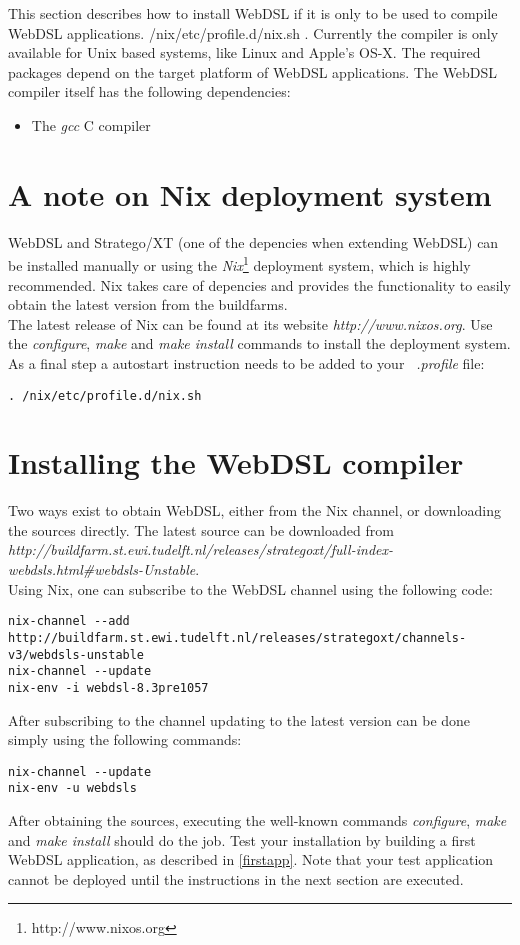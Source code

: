 This section describes how to install WebDSL if it is only to be used to compile WebDSL applications. /nix/etc/profile.d/nix.sh
. Currently the compiler is only available for Unix based systems, like Linux and Apple's OS-X. The required packages depend on the target platform of WebDSL applications. 
The WebDSL compiler itself has the following dependencies:
\begin{itemize}
	\item The \emph{gcc} C compiler
\end{itemize}

\section[installnix]{A note on Nix deployment system}
WebDSL and Stratego/XT (one of the depencies when extending WebDSL) can be installed manually or using the \emph{Nix}\footnote{http://www.nixos.org} deployment system, which is highly recommended. Nix takes care of depencies and provides the functionality to easily obtain the latest version from the buildfarms.
\\
The latest release of Nix can be found at its website \emph{http://www.nixos.org}. Use the \emph{configure}, \emph{make} and \emph{make install} commands to install the deployment system. As a final step a autostart instruction needs to be added to your \emph{~.profile} file:
\begin{lstlisting}
. /nix/etc/profile.d/nix.sh
\end{lstlisting}

\section[retreivewebdsl]{Installing the WebDSL compiler}
Two ways exist to obtain WebDSL, either from the Nix channel, or downloading the sources directly. The latest source can be downloaded from \emph{http://buildfarm.st.ewi.tudelft.nl/releases/strategoxt/full-index-webdsls.html\#webdsls-Unstable}.
\\
Using Nix, one can subscribe to the WebDSL channel using the following code: 
\begin{lstlisting}
nix-channel --add http://buildfarm.st.ewi.tudelft.nl/releases/strategoxt/channels-v3/webdsls-unstable
nix-channel --update
nix-env -i webdsl-8.3pre1057
\end{lstlisting}
After subscribing to the channel updating to the latest version can be done simply using the following commands:
\begin{lstlisting}
nix-channel --update
nix-env -u webdsls
\end{lstlisting}
After obtaining the sources, executing the well-known commands \emph{configure}, \emph{make} and \emph{make install} should do the job. Test your installation by building a first WebDSL application, as described in \ref{firstapp}. Note that your test application cannot be deployed until the instructions in the next section are executed. 

